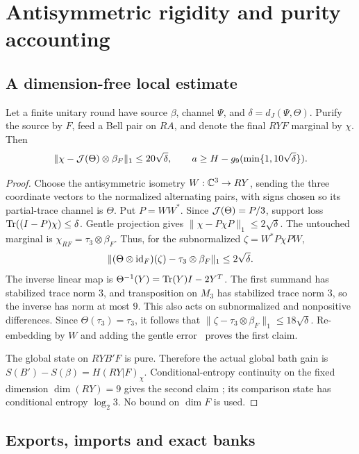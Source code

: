 \section{Antisymmetric rigidity and purity accounting}\label{app:purity}

\subsection{A dimension-free local estimate}

\begin{lemma}\label{lem:qutrit-rigidity}
Let a finite unitary round have source $\beta$, channel $\Psi$, and
$\delta=d_J(\Psi,\Theta)$. Purify the source by $F$, feed a Bell pair
on $RA$, and denote the final $RYF$ marginal by $\chi$. Then
\[
 \|\chi-\mathcal J(\Theta)\otimes\beta_F\|_1\leq20\sqrt\delta,
 \qquad a\geq H-g_9(\min\{1,10\sqrt\delta\}).
\]
\end{lemma}
\begin{proof}
Choose the antisymmetric isometry $W:\mathbb C^3\to RY$, sending the three
coordinate vectors to the normalized alternating pairs, with signs
chosen so its partial-trace channel is $\Theta$. Put $P=WW^*$.
Since $\mathcal J(\Theta)=P/3$, support loss
$\operatorname{Tr}((I-P)\chi)\leq\delta$. Gentle projection gives
$\|\chi-P\chi P\|_1\leq2\sqrt\delta$.
The untouched marginal is $\chi_{RF}=\tau_3\otimes\beta_F$.
Thus, for the subnormalized $\zeta=W^*P\chi PW$,
\[
 \|(\Theta\otimes\mathrm{id}_F)(\zeta)-\tau_3\otimes\beta_F\|_1
 \leq2\sqrt\delta.
\]
The inverse linear map is
$\Theta^{-1}(Y)=\operatorname{Tr}(Y)I-2Y^T$. The first summand has stabilized
trace norm $3$, and transposition on $M_3$ has stabilized trace norm
$3$, so the inverse has norm at most $9$. This also acts on
subnormalized and nonpositive differences. Since
$\Theta(\tau_3)=\tau_3$, it follows that
$\|\zeta-\tau_3\otimes\beta_F\|_1\leq18\sqrt\delta$.
Re-embedding by $W$ and adding the gentle error~\cite[Lemma~9]{Winter1999} proves the first claim.

The global state on $RYB'F$ is pure. Therefore the actual global
bath gain is
$S(B')-S(\beta)=H(RY|F)_\chi$. Conditional-entropy continuity
on the fixed dimension $\dim(RY)=9$ gives the second claim
\cite[Lemma~2]{Winter2016}; its comparison state has conditional
entropy $\log_2 3$. No bound on $\dim F$ is used.
\end{proof}

\subsection{Exports, imports and exact banks}

